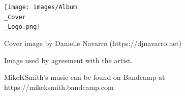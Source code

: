 \documentclass[
  12pt,
  letterpaper,
  oneside,
  open=any]{scrbook}
\begin{document}
\begin{frontmatter}
\begin{titlepage}
\newcommand{\titlepageheaderblock}{\headerstyled}

\newcommand{\titlepagefooterblock}{
\footerstyled
}

\newcommand{\titlepagedateblock}{
\datestyled
}

\newcommand{\titleblock}{{

{\titlepagetitleblock}
}

\vspace{1.5cm}
}

\newcommand{\authorblock}{{\titlepageauthorblock}

\vspace{2\baselineskip}
}

\newcommand{\affiliationblock}{{\titlepageaffiliationblock}

\vspace{2\baselineskip}
}

\newcommand{\logoblock}{{\texttt{[image: images/Album\\\_Cover\\\_Logo.png]}}

\vspace{1cm}
}

\newcommand{\footerblock}{}

\newcommand{\dateblock}{{\titlepagedateblock}

\vspace{0pt}
}

\newcommand{\headerblock}{}

\thispagestyle{empty} %


\newlength{\minipagewidth}
\setlength{\minipagewidth}{\textwidth}
\raggedright %
\begin{minipage}[b][\textheight][s]{\minipagewidth}
\titlepagepagealign
\vspace{1.0cm}

\titleblock

\authorblock

\vfill

\logoblock

Cover image by Danielle Navarro (https://djnavarro.net)

Image used by agreement with the artist.

MikeKSmith's music can be found on Bandcamp at
https://mikeksmith.bandcamp.com

\vspace{0.8cm}

\footerblock
\par

\end{minipage}
\clearpage
\restoregeometry
\end{titlepage}
\setcounter{page}{1}
\end{frontmatter}
\end{document}
